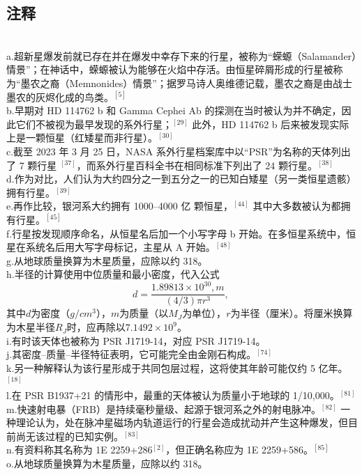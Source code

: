 \subsection{注释}\\
a.超新星爆发前就已存在并在爆发中幸存下来的行星，被称为“蝾螈（Salamander）情景”；在神话中，蝾螈被认为能够在火焰中存活。由恒星碎屑形成的行星被称为“墨农之裔（Memnonides）情景”；据罗马诗人奥维德记载，墨农之裔是由战士墨农的灰烬化成的鸟类。$^{[5]}$\\
b.早期对 HD 114762 b 和 Gamma Cephei Ab 的探测在当时被认为并不确定，因此它们不被视为最早发现的系外行星；$^{[29]}$ 此外，HD 114762 b 后来被发现实际上是一颗恒星（红矮星而非行星）。$^{[30]}$\\
c.截至 2023 年 3 月 25 日，NASA 系外行星档案库中以“PSR”为名称的天体列出了 7 颗行星 $^{[37]}$，而系外行星百科全书在相同标准下列出了 24 颗行星。$^{[38]}$\\
d.作为对比，人们认为大约四分之一到五分之一的已知白矮星（另一类恒星遗骸）拥有行星。$^{[39]}$\\
e.再作比较，银河系大约拥有 1000–4000 亿 颗恒星，$^{[44]}$ 其中大多数被认为都拥有行星。$^{[45]}$\\
f.行星按发现顺序命名，从恒星名后加一个小写字母 b 开始。在多恒星系统中，恒星在系统名后用大写字母标记，主星从 A 开始。$^{[48]}$\\
g.从地球质量换算为木星质量，应除以约 318。\\
h.半径的计算使用中位质量和最小密度，代入公式
  \[
  d=\frac{1.89813\times10^{30}, m}{(4/3)\pi r^3},~
  \]
其中$d$为密度（$g/cm{^3}$），$m$为质量（以$M_J$为单位），$r$为半径（厘米）。将厘米换算为木星半径$R_J$时，应再除以$7.1492\times10^{9}$。\\
i.有时该天体也被称为 PSR J1719-14，对应 PSR J1719-14。\\
j.其密度–质量–半径特征表明，它可能完全由金刚石构成。$^{[74]}$\\
k.另一种解释认为该行星形成于共同包层过程，这将使其年龄可能仅约 5 亿年。$^{[18]}$\\
l.在 PSR B1937+21 的情形中，最重的天体被认为质量小于地球的 1/10,000。$^{[81]}$\\
m.快速射电暴（FRB）是持续毫秒量级、起源于银河系之外的射电脉冲。$^{[82]}$ 一种理论认为，处在脉冲星磁场内轨道运行的行星会造成扰动并产生这种爆发，但目前尚无该过程的已知实例。$^{[83]}$\\
n.有资料称其名称为 1E 2259+286$^{[2]}$，但正确名称应为 1E 2259+586。$^{[85]}$\\
o.从地球质量换算为木星质量，应除以约 318。
